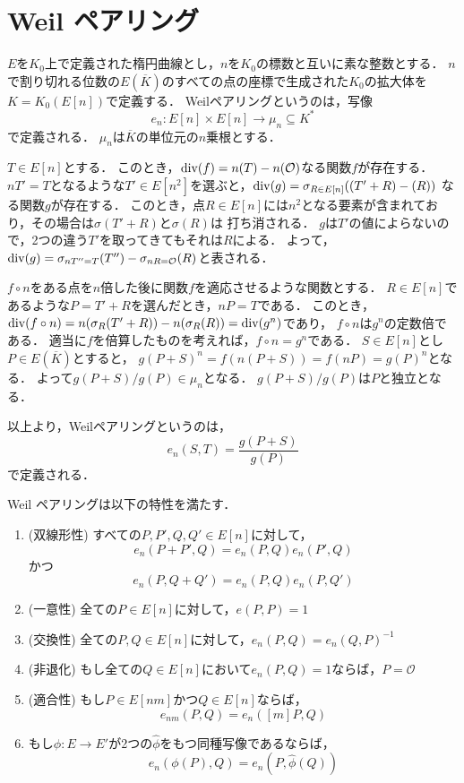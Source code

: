 \section{Weil ペアリング}
\par
$E$を$K _0$上で定義された楕円曲線とし，$n$を$K _0$の標数と互いに素な整数とする．
$n$で割り切れる位数の$E(\overline{K})$のすべての点の座標で生成された$K _0$の拡大体を$K = K _0(E[n])$で定義する．
Weilペアリングというのは，写像
\[
e _n: E[n] \times E[n] \to \mu _n \subseteq K ^*
\]
で定義される．
$\mu _n$は$\overline{K}$の単位元の$n$乗根とする．
\par
$T \in E[n]$とする．
このとき，${\rm div} (f) = n(T) - n(\mathcal{O})$なる関数$f$が存在する．
$nT' = T$となるような$T' \in E[n ^2]$を選ぶと，${\rm div}(g) = \sigma _{R \in E[n]} ((T' + R) - (R))$
なる関数$g$が存在する．
このとき，点$R \in E[n]$には$n ^2$となる要素が含まれており，その場合は$\sigma (T' + R)$と$\sigma (R)$は
打ち消される．
$g$は$T'$の値によらないので，2つの違う$T'$を取ってきてもそれは$R$による．
よって，${\rm div}(g) = \sigma _{nT'' = T} (T'') - \sigma _{nR = \mathcal{O}} (R)$と表される．
\par
$f \circ n$をある点を$n$倍した後に関数$f$を適応させるような関数とする．
$R \in E[n]$であるような$P = T' + R$を選んだとき，$nP = T$である．
このとき，${\rm div}(f \circ n) = n(\sigma _R (T' + R)) - n(\sigma _R (R)) = {\rm div}(g ^n)$であり，
$f \circ n$は$g ^n$の定数倍である．
適当に$f$を倍算したものを考えれば，$f \circ n = g ^n$である．
$S \in E[n]$とし$P \in E(\overline{K})$とすると，
$g(P + S) ^n = f(n(P + S)) = f(nP) = g(P) ^n$となる．
よって$g(P + S) / g(P) \in \mu _n$となる．
$g(P + S) / g(P)$は$P$と独立となる．
\par
以上より，Weilペアリングというのは，
\[
e _n(S, T) = \frac{g(P + S)}{g(P)}
\]
で定義される．
\par
Weil ペアリングは以下の特性を満たす．
\begin{enumerate}
  \item (双線形性) すべての$P, P', Q, Q' \in E[n]$に対して，
  \[
  e _n(P + P', Q) = e _n(P, Q) e _n(P', Q)
  \]
  かつ
  \[
  e _n(P, Q + Q') = e _n(P, Q) e _n(P, Q')
  \]
  \item (一意性) 全ての$P \in E[n]$に対して，$e(P, P) = 1$
  \item (交換性) 全ての$P, Q \in E[n]$に対して，$e _n(P, Q) = e _n(Q, P) ^{-1}$
  \item (非退化) もし全ての$Q \in E[n]$において$e _n(P, Q) = 1$ならば，$P = \mathcal{O}$
  \item (適合性) もし$P \in E[n m]$かつ$Q \in E[n]$ならば，
  \[
  e _{n m}(P, Q) = e _n([m]P, Q)
  \]
  \item もし$\phi:E \to E'$が2つの$\hat{\phi}$をもつ同種写像であるならば，
  \[
  e _n(\phi(P), Q) = e _n(P, \hat{\phi}(Q))
  \]
\end{enumerate}
